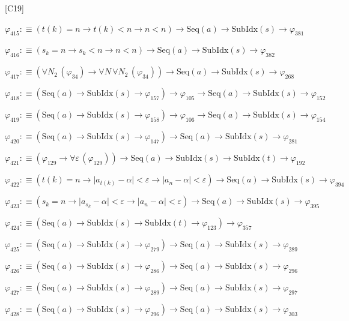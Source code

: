 \begin{fullproof}{[C19]}
\begin{abbrevlist}
\item $\varphi_{415} :\equiv (t(k) = n \to t(k) < n \to n < n) \to \mathrm{Seq}(a) \to \mathrm{SubIdx}(s) \to \varphi_{381}$
\item $\varphi_{416} :\equiv (s_{k} = n \to s_{k} < n \to n < n) \to \mathrm{Seq}(a) \to \mathrm{SubIdx}(s) \to \varphi_{382}$
\item $\varphi_{417} :\equiv (\forall N_{2}\,(\varphi_{34}) \to \forall N\,\forall N_{2}\,(\varphi_{34})) \to \mathrm{Seq}(a) \to \mathrm{SubIdx}(s) \to \varphi_{268}$
\item $\varphi_{418} :\equiv (\mathrm{Seq}(a) \to \mathrm{SubIdx}(s) \to \varphi_{157}) \to \varphi_{105} \to \mathrm{Seq}(a) \to \mathrm{SubIdx}(s) \to \varphi_{152}$
\item $\varphi_{419} :\equiv (\mathrm{Seq}(a) \to \mathrm{SubIdx}(s) \to \varphi_{158}) \to \varphi_{106} \to \mathrm{Seq}(a) \to \mathrm{SubIdx}(s) \to \varphi_{154}$
\item $\varphi_{420} :\equiv (\mathrm{Seq}(a) \to \mathrm{SubIdx}(s) \to \varphi_{147}) \to \mathrm{Seq}(a) \to \mathrm{SubIdx}(s) \to \varphi_{281}$
\item $\varphi_{421} :\equiv (\varphi_{129} \to \forall \varepsilon\,(\varphi_{129})) \to \mathrm{Seq}(a) \to \mathrm{SubIdx}(s) \to \mathrm{SubIdx}(t) \to \varphi_{192}$
\item $\varphi_{422} :\equiv (t(k) = n \to \lvert a_{t(k)} - \alpha \rvert < \varepsilon \to \lvert a_{n} - \alpha \rvert < \varepsilon) \to \mathrm{Seq}(a) \to \mathrm{SubIdx}(s) \to \varphi_{394}$
\item $\varphi_{423} :\equiv (s_{k} = n \to \lvert a_{s_{k}} - \alpha \rvert < \varepsilon \to \lvert a_{n} - \alpha \rvert < \varepsilon) \to \mathrm{Seq}(a) \to \mathrm{SubIdx}(s) \to \varphi_{395}$
\item $\varphi_{424} :\equiv (\mathrm{Seq}(a) \to \mathrm{SubIdx}(s) \to \mathrm{SubIdx}(t) \to \varphi_{123}) \to \varphi_{357}$
\item $\varphi_{425} :\equiv (\mathrm{Seq}(a) \to \mathrm{SubIdx}(s) \to \varphi_{279}) \to \mathrm{Seq}(a) \to \mathrm{SubIdx}(s) \to \varphi_{289}$
\item $\varphi_{426} :\equiv (\mathrm{Seq}(a) \to \mathrm{SubIdx}(s) \to \varphi_{286}) \to \mathrm{Seq}(a) \to \mathrm{SubIdx}(s) \to \varphi_{296}$
\item $\varphi_{427} :\equiv (\mathrm{Seq}(a) \to \mathrm{SubIdx}(s) \to \varphi_{289}) \to \mathrm{Seq}(a) \to \mathrm{SubIdx}(s) \to \varphi_{297}$
\item $\varphi_{428} :\equiv (\mathrm{Seq}(a) \to \mathrm{SubIdx}(s) \to \varphi_{296}) \to \mathrm{Seq}(a) \to \mathrm{SubIdx}(s) \to \varphi_{303}$

\end{abbrevlist}
\end{fullproof}
